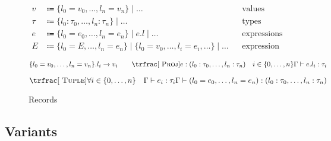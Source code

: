 \documentclass[nonacm]{acmart}
\begin{document}
\begin{figure}
  \begin{framed}
    \begin{align*}
      v    & \Coloneqq \{l_0 = v_0, \dots, l_n = v_n\} \mid \dots                                              &  & \text{values}             \\
      \tau & \Coloneqq \{l_0 : \tau_0, \dots, l_n : \tau_n \} \mid \dots                                       &  & \text{types}              \\
      e    & \Coloneqq \{l_0 = e_0, \dots, l_n = e_n\} \mid e.l \mid \dots                                     &  & \text{expressions}        \\
      E    & \Coloneqq  \{l_0 = E, \dots, l_n = e_n \} \mid \{l_0 = v_0, \dots, l_i = e_i, \dots \} \mid \dots &  & \text{expression context}
    \end{align*}

    \[
      \{l_0 = v_0, \dots, l_n = v_n\}.l_i \rightarrow v_i
      \qquad
      \trfrac[~\textsc{Proj}]{e : (l_0 : \tau_0, \dots, l_n : \tau_n) \quad i \in \{0, \dots, n\}}{\Gamma \vdash e.l_i : \tau_i}
    \]

    \[
      \trfrac[~\textsc{Tuple}]{\forall i \in \{0, \dots, n\} \quad \Gamma \vdash e_i : \tau_i}{\Gamma \vdash (l_0 = e_0, \dots, l_n = e_n) : (l_0 : \tau_0, \dots, l_n : \tau_n)}
    \]
  \end{framed}
  \caption{Records}\label{fig:records}
\end{figure}

\subsection{Variants}
\end{document}
